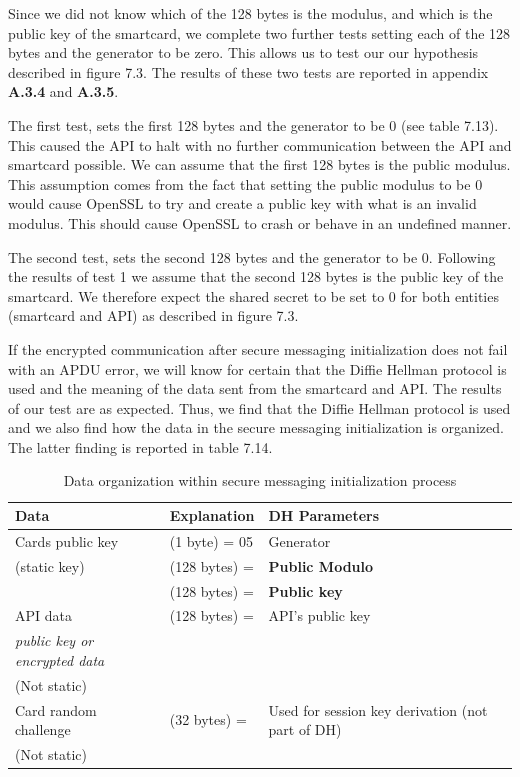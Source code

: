 \documentclass[bsc,frontabs,twoside,singlespacing,parskip,deptreport]{infthesis}     %
\begin{document}
Since we did not know which of the 128 bytes is the modulus, and which is the public key of the smartcard, we complete two further tests setting each of the 128 bytes and the generator to be zero. This allows us to test our our hypothesis described in figure 7.3. The results of these two tests are reported in appendix \textbf{A.3.4} and \textbf{A.3.5}.

The first test, sets the first 128 bytes and the generator to be 0 (see table 7.13). This caused the API to halt with no further communication between the API and smartcard possible. We can assume that the first 128 bytes is the public modulus. This assumption comes from the fact that setting the public modulus to be 0 would cause OpenSSL to try and create a public key with what is an invalid modulus. This should cause OpenSSL to crash or behave in an undefined manner.

The second test, sets the second 128 bytes and the generator to be 0. Following the results of test 1 we assume that the second 128 bytes is the public key of the smartcard. We therefore expect the shared secret to be set to 0 for both entities (smartcard and API) as described in figure 7.3. 

If the encrypted communication after secure messaging initialization does not fail with an APDU error, we will know for certain that the Diffie Hellman protocol is used and the meaning of the data sent from the smartcard and API. The results of our test are as expected. Thus, we find that the Diffie Hellman protocol is used and we also find how the data in the secure messaging initialization is organized. The latter finding is reported in table 7.14.

\begin{table}[H]
\hskip-1.3cm\begin{tabular}{|l|l|l|}
\hline
Data & Explanation & DH Parameters\\
\hline
Cards public key & (1 byte) = 05 & Generator\\
(static key)    & (128 bytes) =  & \textbf{Public Modulo}\\
                 & (128 bytes) = & \textbf{Public key}\\
\hline
API data & (128 bytes) = & API's public key\\
\textit{public key or encrypted data} & &\\
(Not static) & & \\
\hline
Card random challenge & (32 bytes) = & Used for session key derivation (not part of DH)\\
(Not static) & & \\
\hline
\end{tabular}
\caption{Data organization within secure messaging initialization process}
\end{table}
\end{document}
